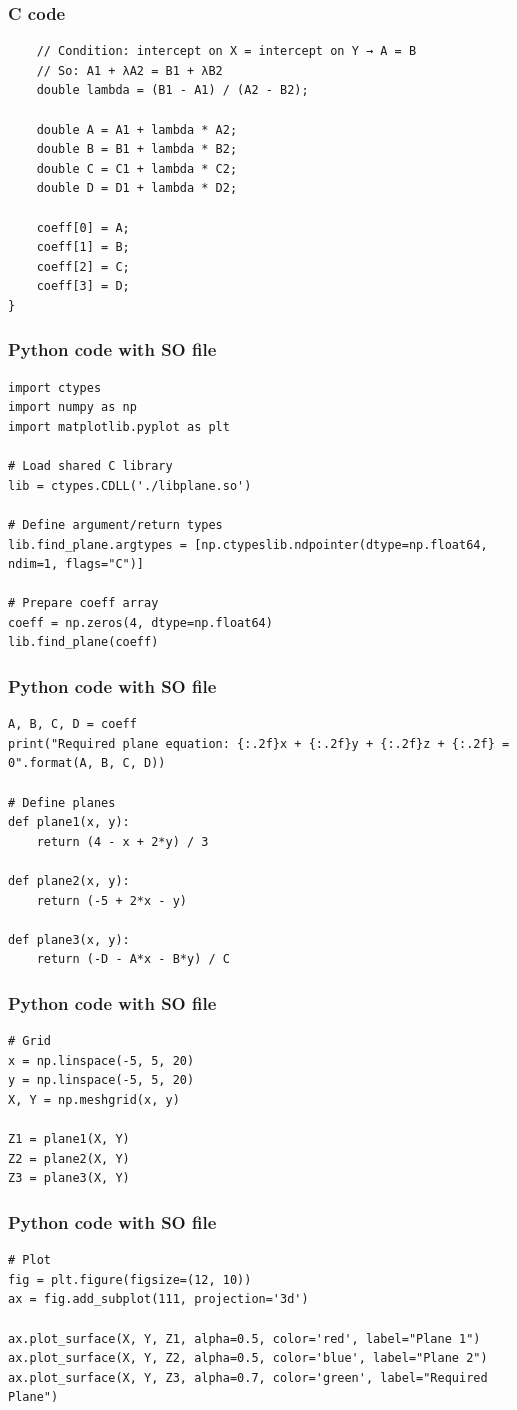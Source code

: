 \documentclass{beamer}
\begin{document}
\begin{frame}[fragile]
\frametitle{C code}
\begin{lstlisting}
    // Condition: intercept on X = intercept on Y → A = B
    // So: A1 + λA2 = B1 + λB2
    double lambda = (B1 - A1) / (A2 - B2);

    double A = A1 + lambda * A2;
    double B = B1 + lambda * B2;
    double C = C1 + lambda * C2;
    double D = D1 + lambda * D2;

    coeff[0] = A;
    coeff[1] = B;
    coeff[2] = C;
    coeff[3] = D;
}
\end{lstlisting}
\end{frame}
\begin{frame}[fragile]
\frametitle{Python code with SO file}
\begin{lstlisting}
import ctypes
import numpy as np
import matplotlib.pyplot as plt

# Load shared C library
lib = ctypes.CDLL('./libplane.so')

# Define argument/return types
lib.find_plane.argtypes = [np.ctypeslib.ndpointer(dtype=np.float64, ndim=1, flags="C")]

# Prepare coeff array
coeff = np.zeros(4, dtype=np.float64)
lib.find_plane(coeff)
\end{lstlisting}
\end{frame}
\begin{frame}[fragile]
\frametitle{Python code with SO file}
\begin{lstlisting}
A, B, C, D = coeff
print("Required plane equation: {:.2f}x + {:.2f}y + {:.2f}z + {:.2f} = 0".format(A, B, C, D))

# Define planes
def plane1(x, y):
    return (4 - x + 2*y) / 3

def plane2(x, y):
    return (-5 + 2*x - y)

def plane3(x, y):
    return (-D - A*x - B*y) / C
\end{lstlisting}
\end{frame}
\begin{frame}[fragile]
\frametitle{Python code with SO file}
\begin{lstlisting}
# Grid
x = np.linspace(-5, 5, 20)
y = np.linspace(-5, 5, 20)
X, Y = np.meshgrid(x, y)

Z1 = plane1(X, Y)
Z2 = plane2(X, Y)
Z3 = plane3(X, Y)
\end{lstlisting}
\end{frame}
\begin{frame}[fragile]
\frametitle{Python code with SO file}
\begin{lstlisting}
# Plot
fig = plt.figure(figsize=(12, 10))
ax = fig.add_subplot(111, projection='3d')

ax.plot_surface(X, Y, Z1, alpha=0.5, color='red', label="Plane 1")
ax.plot_surface(X, Y, Z2, alpha=0.5, color='blue', label="Plane 2")
ax.plot_surface(X, Y, Z3, alpha=0.7, color='green', label="Required Plane")
\end{lstlisting}
\end{frame}
\end{document}
